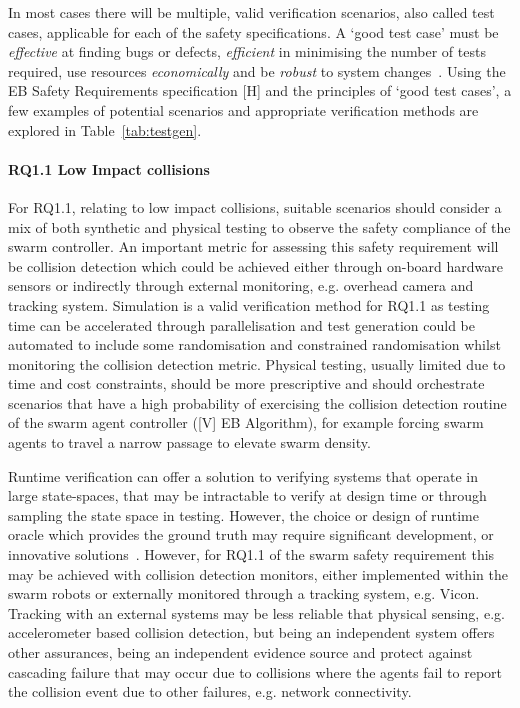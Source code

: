 \documentclass[lettersize,journal]{IEEEtran}
\begin{document}
In most cases there will be multiple, valid verification scenarios, also called test cases, applicable for each of the safety specifications. A `good test case' must be \emph{effective} at finding bugs or defects, \emph{efficient} in minimising the number of tests required, use resources \emph{economically} and be \emph{robust} to system changes~\cite{Fewster1999}. Using the EB Safety Requirements specification [H] and the principles of `good test cases', a few examples of potential scenarios and appropriate verification methods are explored in Table~\ref{tab:testgen}. 

\paragraph*{RQ1.1 Low Impact collisions}

For RQ1.1, relating to low impact collisions, suitable scenarios should consider a mix of both synthetic and physical testing to observe the safety compliance of the swarm controller. An important metric for assessing this safety requirement will be collision detection which could be achieved either through on-board hardware sensors or indirectly through external monitoring, e.g. overhead camera and tracking system. Simulation is a valid verification method for RQ1.1 as testing time can be accelerated through parallelisation and test generation could be automated to include some randomisation and constrained randomisation whilst monitoring the collision detection metric. Physical testing, usually limited due to time and cost constraints, should be more prescriptive and should orchestrate scenarios that have a high probability of exercising the collision detection routine of the swarm agent controller ([V] EB Algorithm), for example forcing swarm agents to travel a narrow passage to elevate swarm density. 

Runtime verification can offer a solution to verifying systems that operate in large state-spaces, that may be intractable to verify at design time or through sampling the state space in testing. However, the choice or design of runtime oracle which provides the ground truth may require significant development, or innovative solutions~\cite{maple2020cyres}. However, for RQ1.1 of the swarm safety requirement this may be achieved with collision detection monitors, either implemented within the swarm robots or externally monitored through a tracking system, e.g. Vicon. Tracking with an external systems may be less reliable that physical sensing, e.g. accelerometer based collision detection, but being an independent system offers other assurances, being an independent evidence source and protect against cascading failure that may occur due to collisions where the agents fail to report the collision event due to other failures, e.g. network connectivity.
\end{document}
